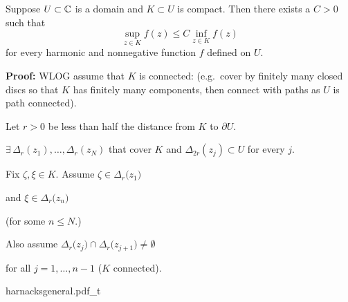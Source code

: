 \documentclass[10pt,aspectratio=169]{beamer}
\begin{document}
\begin{frame}
\begin{corollary}
Suppose $U \subset {\mathbb{C}}$ is a domain and $K \subset U$ is compact.
Then there exists a $C > 0$ such that
\begin{equation*}
\sup_{z \in K} f(z) \leq C \inf_{z\in K} f(z)
\end{equation*}
for every harmonic and nonnegative function $f$ defined on $U$.
\end{corollary}

\pause

\textbf{Proof:}
WLOG assume that $K$ is connected: \pause
(e.g.\ cover by finitely many closed discs so that $K$ has finitely many
components, then connect with paths as
$U$ is path connected).

\medskip
\pause

Let 
$r> 0$ be less than half the distance from $K$ to $\partial U$.

\pause
$\exists \, \Delta_{r}(z_1),\ldots,\Delta_{r}(z_N)$ that cover $K$
and
$\Delta_{2r}(z_j) \subset U$ for every $j$.

\pause
Fix $\zeta,\xi \in K$.
\pause
Assume
$\zeta \in \Delta_{r}\bigl(z_{1}\bigr)$

and
$\xi \in \Delta_{r}\bigl(z_{n}\bigr)$

(for some $n \leq N$.)
\pause

Also assume
$\Delta_{r}\bigl(z_{j}\bigr) \cap \Delta_{r}\bigl(z_{j+1}\bigr)
\not=\emptyset$

for all $j=1,\ldots,n-1$ ($K$ connected).
\pause

\vspace*{-0.9in}
\hfill
{harnacksgeneral.pdf_t}

\end{frame}
\end{document}
